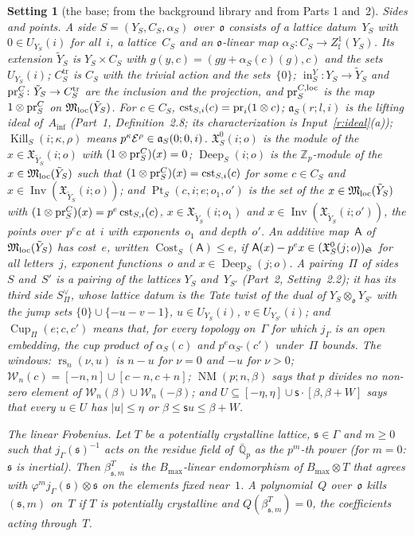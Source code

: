 \documentclass[11pt,a4paper]{article}
\newcommand{\kw}[1]{\emph{#1}}
\newcommand{\m}[1]{\mbox{$#1$}}        %
\theoremstyle{plainx}
\theoremstyle{uprightx}
\newtheorem{setting}[theorem]{Setting}          %
\providecommand{\Zp}{\mathbb{Z}_p}\providecommand{\Qp}{\mathbb{Q}_p}\providecommand{\GQp}{G_{\mathbb{Q}_p}}
\providecommand{\Ainf}{A_{\inf}}\providecommand{\WC}{W(C^{\flat})}\providecommand{\BdR}{B_{\mathrm{dR}}}
\providecommand{\fo}{\mathfrak{o}}\providecommand{\fc}{\mathfrak{c}}\providecommand{\fd}{\mathfrak{d}}
\providecommand{\wExp}[3]{\mathfrak{X}_{#1}(#2;#3)}
\providecommand{\locKP}[1]{(#1)_{\fS}}
\providecommand{\invMod}[1]{\operatorname{Inv}(#1)}
\providecommand{\extL}[1]{\tilde{Y}_{#1}}
\providecommand{\trivL}[1]{C^{\mathrm{tr}}_{#1}}
\providecommand{\projC}[1]{\pr^{C}_{#1}}
\providecommand{\JumpWin}[5]{#5\subseteq[-#1,#1]\cup#2\cdot[#3,#3+#4]}
\providecommand{\raisedE}[3]{\operatorname{rs}_{#1}(#2,#3)}
\providecommand{\twoWin}[2]{\mathcal{W}_{#1}(#2)}
\providecommand{\NoMult}[3]{\operatorname{NM}(#1;#2,#3)}
\providecommand{\constAt}[3]{\operatorname{cst}_{#1,#2}(#3)}
\providecommand{\liftId}[4]{\mathfrak{a}_{#1}(#2;#3,#4)}
\providecommand{\Kills}[4]{\operatorname{Kill}_{#1}(#2;#3,#4)}
\providecommand{\Reaches}[3]{\operatorname{Cost}_{#1}(#3)\le #2}
\providecommand{\inclY}[1]{\operatorname{in}^{Y}_{#1}}
\providecommand{\projCloc}[1]{\pr^{C,\mathrm{loc}}_{#1}}
\providecommand{\third}[1]{S^{\vee}_{#1}}
\providecommand{\CupB}[4]{\operatorname{Cup}_{#1}(#2;#3,#4)}
\providecommand{\kerX}[3]{\mathfrak{X}^{0}_{#1}(#2;#3)}
\providecommand{\deepE}[3]{\operatorname{Deep}_{#1}(#2;#3)}
\providecommand{\ptsOver}[6]{\operatorname{Pt}_{#1}(#2,#3;#4;#5,#6)}
\providecommand{\linF}[3]{\beta^{#1}_{#2,#3}}
\begin{document}
\begin{setting}[the base; from the background library and from Parts 1 and~2]
\emph{Sides and points.} A side $S=(Y_S,C_S,\alpha_S)$ over~$\fo$ consists of a lattice datum~$Y_S$ with
\m{0\in U_{Y_S}(i)} for all~$i$, a lattice~$C_S$ and an $\fo$-linear map $\alpha_S\colon C_S\to
Z^{1}_{\mathrm{f}}(Y_S)$. Its extension \m{\extL{S}} is \m{Y_S\times C_S} with $g(y,c)=(gy+\alpha_S(c)(g),c)$
and the sets \m{U_{Y_S}(i)}; \m{\trivL{S}} is $C_S$ with the trivial action and the sets~$\{0\}$;
$\inclY{S}\colon Y_S\to\extL{S}$ and $\projC{S}\colon\extL{S}\to\trivL{S}$ are the inclusion and the
projection, and \m{\projCloc{S}} is the map \m{1\otimes\projC{S}} on \m{\Mloc(\extL{S})}. For \m{c\in C_S},
$\constAt{S}{i}{c}=\pr_i(1\otimes c)$; $\liftId{S}{r}{l}{i}$ is the lifting ideal of~$\Ainf$ (Part~1,
Definition~2.8; its characterization is Input~\ref{r:ideal}(a)); $\Kills{S}{i}{\kappa}{\rho}$ means
$p^{\kappa}\cE^{\rho}\in\liftId{S}{0}{0}{i}$. \m{\kerX{S}{i}{o}} is the module of the
$x\in\wExp{\extL{S}}{i}{o}$ with $(1\otimes\projC{S})(x)=0$; \m{\deepE{S}{i}{o}} is the $\Zp$-module of
the $x\in\Mloc(\extL{S})$ such that $(1\otimes\projC{S})(x)=\constAt{S}{i}{c}$ for some \m{c\in C_S} and
$x\in\invMod{\wExp{\extL{S}}{i}{o}}$; and $\ptsOver{S}{c}{i}{e}{o_1}{o'}$ is the set of the
$x\in\Mloc(\extL{S})$ with $(1\otimes\projC{S})(x)=p^{e}\constAt{S}{i}{c}$, $x\in\wExp{\extL{S}}{i}{o_1}$
and $x\in\invMod{\wExp{\extL{S}}{i}{o'}}$, the points over~$p^{e}c$ at~$i$ with exponents~$o_1$ and
depth~$o'$. An additive map~$\mathsf{A}$ of \m{\Mloc(\extL{S})} \kw{has cost~$e$}, written
$\Reaches{S}{e}{\mathsf{A}}$, if $\mathsf{A}(x)-p^{e}x\in\locKP{\kerX{S}{j}{o}}$ for all letters~$j$,
exponent functions~$o$ and $x\in\deepE{S}{j}{o}$. A pairing~$\Pi$ of sides $S$ and~$S'$ is a pairing of
the lattices $Y_S$ and~$Y_{S'}$ (Part~2, Setting~2.2); it has its third side \m{\third{\Pi}}, whose lattice datum
is the Tate twist of the dual of $Y_S\otimes_{\fo}Y_{S'}$ with the jump sets
$\{0\}\cup\{-u-v-1\}$, \m{u\in U_{Y_S}(i)}, \m{v\in U_{Y_{S'}}(i)}; and $\CupB{\Pi}{e}{c}{c'}$ means that,
for every topology on~$\Gamma$ for which $j_\Gamma$ is an open embedding, the cup product of \m{\alpha_S(c)}
and $p^{e}\alpha_{S'}(c')$ under~$\Pi$ bounds. The windows: $\raisedE{n}{\nu}{u}$ is \m{n-u} for \m{\nu=0}
and \m{-u} for \m{\nu>0}; $\twoWin{n}{c}=[-n,n]\cup[c-n,c+n]$; $\NoMult{p}{n}{\beta}$ says that $p$ divides
no non-zero element of $\twoWin{n}{\beta}\cup\twoWin{n}{-\beta}$; and
$\JumpWin{\eta}{\mathsf{s}}{\beta}{W}{U}$ says that every \m{u\in U} has \m{|u|\le\eta} or
$\beta\le\mathsf{s} u\le\beta+W$.

\emph{The linear Frobenius.} Let $T$ be a potentially crystalline lattice, \m{\mathfrak{s}\in\Gamma} and \m{m\ge0} such
that \m{j_\Gamma(\mathfrak{s})^{-1}} acts on the residue field of~$\bar{\mathbb{Q}}_p$ as the $p^{m}$-th power (for
\m{m=0}: $\mathfrak{s}$ is inertial). Then \m{\linF{T}{\mathfrak{s}}{m}} is the $B_{\max}$-linear endomorphism of
\m{B_{\max}\otimes T} that agrees with $\varphi^{m}j_\Gamma(\mathfrak{s})\otimes \mathfrak{s}$ on the elements fixed near~$1$. A
polynomial~$Q$ over~$\fo$ \kw{kills \m{(\mathfrak{s},m)} on~$T$} if $T$ is potentially crystalline and
$Q(\linF{T}{\mathfrak{s}}{m})=0$, the coefficients acting through~$T$.


\end{setting}
\end{document}

